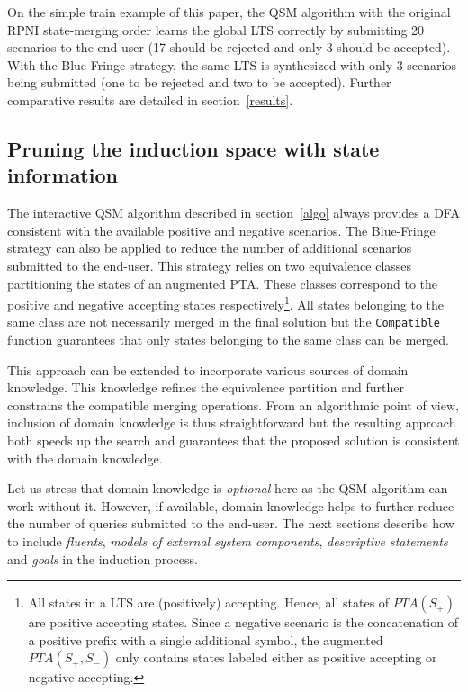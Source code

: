 On the simple train example of this paper, the QSM algorithm with the original RPNI state-merging order learns the global LTS correctly by submitting 20 scenarios to the end-user (17 should be rejected and only 3 should be accepted). With the Blue-Fringe strategy, the same LTS is synthesized with only 3 scenarios being submitted (one to be rejected and two to be accepted). Further comparative results are detailed in section~\ref{results}.

\subsection{Pruning the induction space with state information\label{subsection:induction-pruning-with-state-info}}

The interactive QSM algorithm described in section~\ref{algo} always provides a DFA consistent with the available positive and negative scenarios. The Blue-Fringe strategy can also be applied to reduce the number of additional scenarios submitted to the end-user. This strategy relies on two equivalence classes partitioning the states of an augmented PTA. These classes correspond to the positive and negative accepting states respectively\footnote{All states in a LTS are (positively) accepting. Hence, all states of $PTA(S_+)$ are positive accepting states. Since a negative scenario is the concatenation of a positive prefix with a single additional symbol, the augmented $PTA(S_+, S_-)$ only contains states labeled either as positive accepting or negative accepting.}. All states belonging to the same class are not necessarily merged in the final solution but the \texttt{Compatible} function guarantees that only states belonging to the same class can be merged.

This approach can be extended to incorporate various sources of domain knowledge. This knowledge refines the equivalence partition and further constrains the compatible merging operations. From an algorithmic point of view, inclusion of domain knowledge is thus straightforward but the resulting approach both speeds up the search and guarantees that the proposed solution is consistent with the domain knowledge.

Let us stress that domain knowledge is \textsl{optional} here as the QSM algorithm can work without it. However, if available, domain knowledge helps to further reduce the number of queries submitted to the end-user. The next sections describe how to include \textsl{fluents}, \textsl{models of external system components}, \textsl{descriptive statements} and \textsl{goals} in the induction process.

